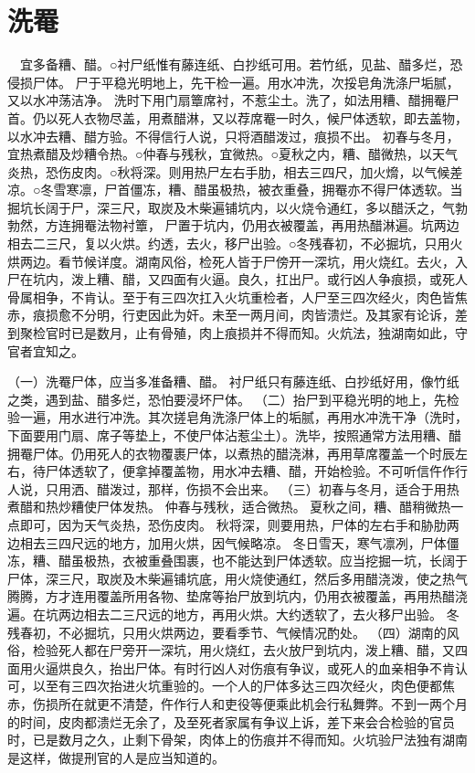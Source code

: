 \documentclass[12pt,UTF8]{ctexbook}
\begin{document}
\chapter{洗罨}

　宜多备糟、醋。○衬尸纸惟有藤连纸、白抄纸可用。若竹纸，见盐、醋多烂，恐侵损尸体。
尸于平稳光明地上，先干检一遍。用水冲洗，次挼皂角洗涤尸垢腻，又以水冲荡洁净。
洗时下用门扇簟席衬，不惹尘土。洗了，如法用糟、醋拥罨尸首。仍以死人衣物尽盖，用煮醋淋，又以荐席罨一时久，候尸体透软，即去盖物，以水冲去糟、醋方验。不得信行人说，只将酒醋泼过，痕损不出。
初春与冬月，宜热煮醋及炒糟令热。○仲春与残秋，宜微热。○夏秋之内，糟、醋微热，以天气炎热，恐伤皮肉。○秋将深。则用热尸左右手肋，相去三四尺，加火熁，以气候差凉。○冬雪寒凛，尸首僵冻，糟、醋虽极热，被衣重叠，拥罨亦不得尸体透软。当掘坑长阔于尸，深三尺，取炭及木柴遍铺坑内，以火烧令通红，多以醋沃之，气勃勃然，方连拥罨法物衬簟， 尸置于坑内，仍用衣被覆盖，再用热醋淋遍。坑两边相去二三尺，复以火烘。约透，去火，移尸出验。○冬残春初，不必掘坑，只用火烘两边。看节候详度。湖南风俗，检死人皆于尸傍开一深坑，用火烧红。去火，入尸在坑内，泼上糟、醋，又四面有火逼。良久，扛出尸。或行凶人争痕损，或死人骨属相争，不肯认。至于有三四次扛入火坑重检者，人尸至三四次经火，肉色皆焦赤，痕损愈不分明，行吏因此为奸。未至一两月间，肉皆溃烂。及其家有论诉，差到聚检官时已是数月，止有骨殖，肉上痕损并不得而知。火炕法，独湖南如此，守官者宜知之。


（一）洗罨尸体，应当多准备糟、醋。
衬尸纸只有藤连纸、白抄纸好用，像竹纸之类，遇到盐、醋多烂，恐怕要浸坏尸体。
（二）抬尸到平稳光明的地上，先检验一遍，用水进行冲洗。其次搓皂角洗涤尸体上的垢腻，再用水冲洗干净（洗时，下面要用门扇、席子等垫上，不使尸体沾惹尘土）。洗毕，按照通常方法用糟、醋拥罨尸体。仍用死人的衣物覆裹尸体，以煮热的醋浇淋，再用草席覆盖一个时辰左右，待尸体透软了，便拿掉覆盖物，用水冲去糟、醋，开始检验。不可听信仵作行人说，只用洒、醋泼过，那样，伤损不会出来。
（三）初春与冬月，适合于用热煮醋和热炒糟使尸体发热。
仲春与残秋，适合微热。
夏秋之间，糟、醋稍微热一点即可，因为天气炎热，恐伤皮肉。
秋将深，则要用热，尸体的左右手和胁肋两边相去三四尺远的地方，加用火烘，因气候略凉。
冬日雪天，寒气凛冽，尸体僵冻，糟、醋虽极热，衣被重叠围裹，也不能达到尸体透软。应当挖掘一坑，长阔于尸体，深三尺，取炭及木柴遍铺坑底，用火烧使通红，然后多用醋浇泼，使之热气腾腾，方才连用覆盖所用各物、垫席等抬尸放到坑内，仍用衣被覆盖，再用热醋浇遍。在坑两边相去二三尺远的地方，再用火烘。大约透软了，去火移尸出验。
冬残春初，不必掘坑，只用火烘两边，要看季节、气候情况酌处。
（四）湖南的风俗，检验死人都在尸旁开一深坑，用火烧红，去火放尸到坑内，泼上糟、醋，又四面用火逼烘良久，抬出尸体。有时行凶人对伤痕有争议，或死人的血亲相争不肯认可，以至有三四次抬进火坑重验的。一个人的尸体多达三四次经火，肉色便都焦赤，伤损所在就更不清楚，仵作行人和吏役等便乘此机会行私舞弊。不到一两个月的时间，皮肉都溃烂无余了，及至死者家属有争议上诉，差下来会合检验的官员时，已是数月之久，止剩下骨架，肉体上的伤痕并不得而知。火坑验尸法独有湖南是这样，做提刑官的人是应当知道的。
\end{document}
